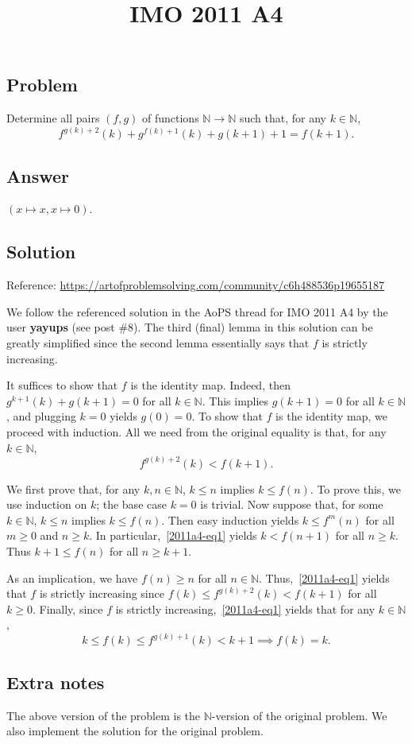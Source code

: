 \documentclass{article}
\title{IMO 2011 A4}
\author{}
\date{}
\newcommand{\N}{\mathbb{N}}
\begin{document}
\maketitle



\subsection*{Problem}

Determine all pairs $(f, g)$ of functions $\N \to \N$ such that, for any $k \in \N$,
\[ f^{g(k) + 2}(k) + g^{f(k) + 1}(k) + g(k + 1) + 1 = f(k + 1). \]



\subsection*{Answer}

$(x \mapsto x, x \mapsto 0)$.



\subsection*{Solution}

Reference: \url{https://artofproblemsolving.com/community/c6h488536p19655187}

We follow the referenced solution in the AoPS thread for IMO 2011 A4 by the user \textbf{yayups} (see post \#8).
The third (final) lemma in this solution can be greatly simplified since the second lemma essentially says that $f$ is strictly increasing.

It suffices to show that $f$ is the identity map.
Indeed, then $g^{k + 1}(k) + g(k + 1) = 0$ for all $k \in \N$.
This implies $g(k + 1) = 0$ for all $k \in \N$, and plugging $k = 0$ yields $g(0) = 0$.
To show that $f$ is the identity map, we proceed with induction.
All we need from the original equality is that, for any $k \in \N$,
\[ f^{g(k) + 2}(k) < f(k + 1). \tag{1}\label{2011a4-eq1} \]

We first prove that, for any $k, n \in \N$, $k \leq n$ implies $k \leq f(n)$.
To prove this, we use induction on $k$; the base case $k = 0$ is trivial.
Now suppose that, for some $k \in \N$, $k \leq n$ implies $k \leq f(n)$.
Then easy induction yields $k \leq f^m(n)$ for all $m \geq 0$ and $n \geq k$.
In particular,~\eqref{2011a4-eq1} yields $k < f(n + 1)$ for all $n \geq k$.
Thus $k + 1 \leq f(n)$ for all $n \geq k + 1$.

As an implication, we have $f(n) \geq n$ for all $n \in \N$.
Thus,~\eqref{2011a4-eq1} yields that $f$ is strictly increasing since $f(k) \leq f^{g(k) + 2}(k) < f(k + 1)$ for all $k \geq 0$.
Finally, since $f$ is strictly increasing,~\eqref{2011a4-eq1} yields that for any $k \in \N$,
\[ k \leq f(k) \leq f^{g(k) + 1}(k) < k + 1 \implies f(k) = k. \]



\subsection*{Extra notes}

The above version of the problem is the $\N$-version of the original problem.
We also implement the solution for the original problem.
\end{document}
